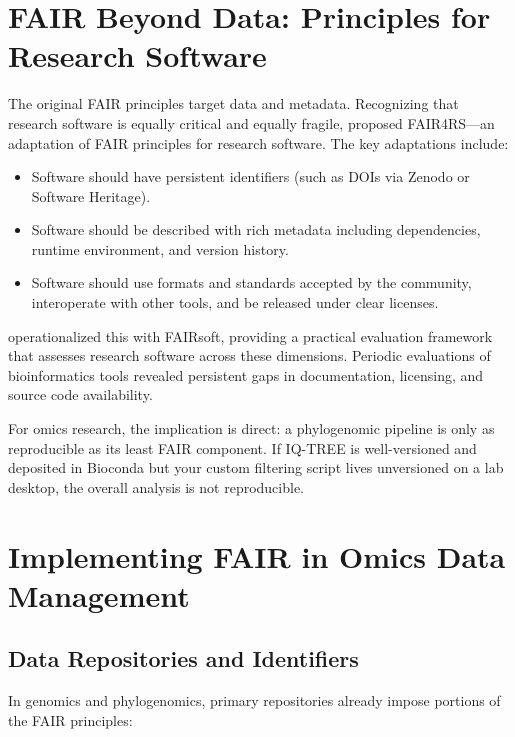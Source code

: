 \section{FAIR Beyond Data: Principles for Research Software}

The original FAIR principles target data and metadata. Recognizing that research software is equally critical and equally fragile, \textcite{barker2022} proposed FAIR4RS---an adaptation of FAIR principles for research software. The key adaptations include:

\begin{itemize}
\item Software should have persistent identifiers (such as DOIs via Zenodo or Software Heritage).
\item Software should be described with rich metadata including dependencies, runtime environment, and version history.
\item Software should use formats and standards accepted by the community, interoperate with other tools, and be released under clear licenses.
\end{itemize}

\textcite{martindelico2024} operationalized this with FAIRsoft, providing a practical evaluation framework that assesses research software across these dimensions. Periodic evaluations of bioinformatics tools revealed persistent gaps in documentation, licensing, and source code availability.

For omics research, the implication is direct: a phylogenomic pipeline is only as reproducible as its least FAIR component. If IQ-TREE is well-versioned and deposited in Bioconda but your custom filtering script lives unversioned on a lab desktop, the overall analysis is not reproducible.

\section{Implementing FAIR in Omics Data Management}

\subsection{Data Repositories and Identifiers}

In genomics and phylogenomics, primary repositories already impose portions of the FAIR principles:

